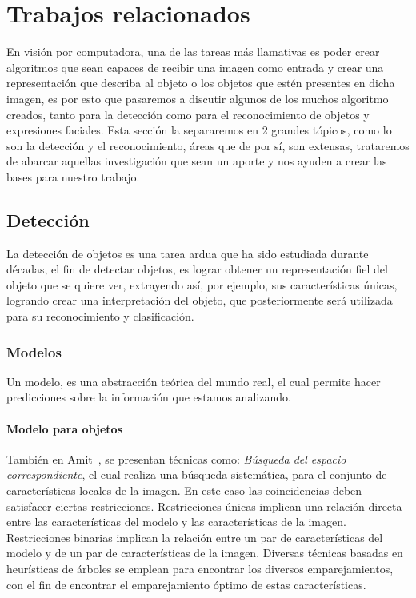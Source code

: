 \chapter[Trabajos relacionados ]{Trabajos relacionados }\label{ch:capitulo2}

En visión por computadora, una de las tareas más llamativas es poder crear algoritmos que sean capaces de recibir una imagen como entrada y crear una representación que describa al objeto o los objetos que estén presentes en dicha imagen, es por esto que pasaremos a discutir algunos de los muchos algoritmo creados, tanto para la detección como para el reconocimiento de objetos y expresiones faciales. Esta sección la separaremos en 2 grandes tópicos, como lo son la detección y el reconocimiento, áreas que de por sí, son extensas, trataremos de abarcar aquellas investigación que sean un aporte y nos ayuden a crear las bases para nuestro trabajo.

\section{Detección}
La detección de objetos es una tarea ardua que ha sido estudiada durante décadas, el fin de detectar objetos, es lograr obtener un representación fiel del objeto que se quiere ver, extrayendo así, por ejemplo, sus características únicas, logrando crear una interpretación del objeto, que posteriormente será utilizada para su reconocimiento y clasificación.

\subsection{Modelos}
Un modelo, es una abstracción teórica del mundo real, el cual permite hacer predicciones sobre la información que estamos analizando.
\subsubsection{Modelo para objetos}
También en Amit~\cite{2dobject2002}, se presentan técnicas como: \textit{Búsqueda del espacio correspondiente}, el cual realiza una búsqueda sistemática, para el conjunto de características locales de la imagen. En este caso las coincidencias deben satisfacer ciertas restricciones. Restricciones únicas implican una relación directa entre las características del modelo y las características de la imagen. Restricciones binarias implican la relación entre un par de características del modelo y de un par de características de la imagen. Diversas técnicas basadas en heurísticas de árboles se emplean para encontrar los diversos emparejamientos, con el fin de encontrar el emparejamiento óptimo de estas características.

